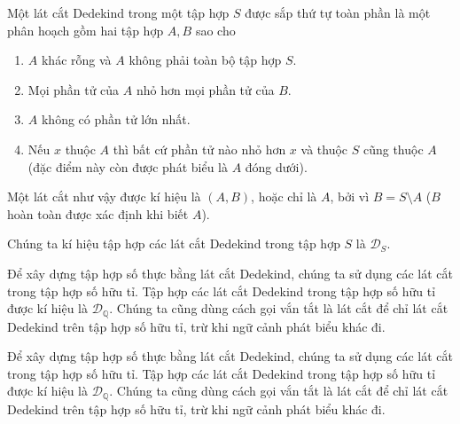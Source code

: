 \begin{definition}
	Một lát cắt Dedekind trong một tập hợp $S$ được sắp thứ tự toàn phần là một phân hoạch gồm hai tập hợp $A, B$ sao cho
	\begin{enumerate}[label={(DC\arabic*)},itemindent=0.5cm]
		\item $A$ khác rỗng và $A$ không phải toàn bộ tập hợp $S$.
		\item Mọi phần tử của $A$ nhỏ hơn mọi phần tử của $B$.
		\item $A$ không có phần tử lớn nhất.
		\item Nếu $x$ thuộc $A$ thì bất cứ phần tử nào nhỏ hơn $x$ và thuộc $S$ cũng thuộc $A$ (đặc điểm này còn được phát biểu là $A$ đóng dưới).
	\end{enumerate}

	Một lát cắt như vậy được kí hiệu là $(A, B)$, hoặc chỉ là $A$, bởi vì $B = S\setminus A$ ($B$ hoàn toàn được xác định khi biết $A$).

	Chúng ta kí hiệu tập hợp các lát cắt Dedekind trong tập hợp $S$ là $\mathscr{D}_{S}$.
\end{definition}

Để xây dựng tập hợp số thực bằng lát cắt Dedekind, chúng ta sử dụng các lát cắt trong tập hợp số hữu tỉ. Tập hợp các lát cắt Dedekind trong tập hợp số hữu tỉ được kí hiệu là $\mathscr{D}_{\mathbb{Q}}$. Chúng ta cũng dùng cách gọi vắn tắt là lát cắt để chỉ lát cắt Dedekind trên tập hợp số hữu tỉ, trừ khi ngữ cảnh phát biểu khác đi.

Để xây dựng tập hợp số thực bằng lát cắt Dedekind, chúng ta sử dụng các lát cắt trong tập hợp số hữu tỉ. Tập hợp các lát cắt Dedekind trong tập hợp số hữu tỉ được kí hiệu là $\mathscr{D}_{\mathbb{Q}}$. Chúng ta cũng dùng cách gọi vắn tắt là lát cắt để chỉ lát cắt Dedekind trên tập hợp số hữu tỉ, trừ khi ngữ cảnh phát biểu khác đi.

